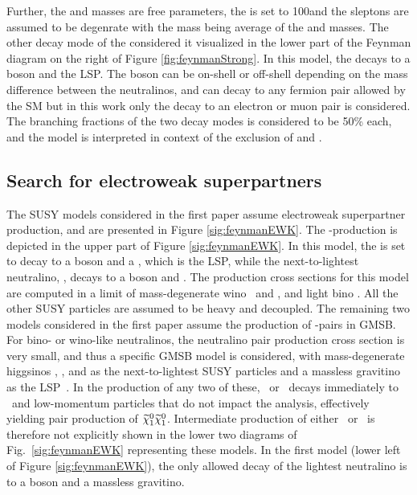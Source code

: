 Further, the \sbottom and \PSGczDt masses are free parameters, the \PSGczDo is set to 100\GeV and the sleptons are assumed to be degenrate with the mass being average of the \PSGczDt and \PSGczDo masses. 
The other decay mode of the \PSGczDt considered it visualized in the lower part of the Feynman diagram on the right of Figure \ref{fig:feynmanStrong}.
In this model, the \PSGczDt decays to a \PZ boson and the \PSGczDo LSP. 
The \PZ boson can be on-shell or off-shell depending on the mass difference between the neutralinos, and can decay to any fermion pair allowed by the SM but in this work only the decay to an electron or muon pair is considered. 
The branching fractions of the two \PSGczDt decay modes is considered to be 50\% each, and the model is interpreted in context of the exclusion of \sbottom and \PSGczDt. 
\subsection*{Search for electroweak superpartners}\label{sec:searchEWK}
\noindent
\justify
The SUSY models considered in the first paper assume electroweak superpartner production, and are presented in Figure \ref{sig:feynmanEWK}. 
The \firstcharg-\secondchi production is depicted in the upper part of Figure \ref{sig:feynmanEWK}. 
In this model, the \firstcharg is set to decay to a \PW boson and a \firstchi, which is the LSP, while the next-to-lightest neutralino, \secondchi, decays to a \PZ boson and \firstchi.
The production cross sections for this model are computed in a limit of mass-degenerate wino \firstcharg\ and \secondchi, and light bino \firstchi.  
All the other SUSY particles are assumed to be heavy and decoupled.
The remaining two models considered in the first paper assume the production of \firstchi-\firstchi pairs in GMSB.
For bino- or wino-like neutralinos, the neutralino pair production cross section is very small, and thus a specific GMSB model is considered, with mass-degenerate higgsinos \firstcharg, \secondchi, and \firstchi as the next-to-lightest SUSY particles and a massless gravitino as the LSP~\cite{Matchev:1999ft,Meade:2009qv,Ruderman}.
In the production of any two of these, \firstcharg\ or \secondchi\ decays immediately to \firstchi\ and low-momentum particles that do not impact the analysis, effectively yielding pair production of $\widetilde{\chi}^{0}_{1}\widetilde{\chi}^{0}_{1}$.
Intermediate production of either \firstcharg\ or \secondchi\ is therefore not explicitly shown in the lower two diagrams of Fig.~\ref{sig:feynmanEWK} representing these models.
In the first model (lower left of Figure \ref{sig:feynmanEWK}), the only allowed decay of the lightest neutralino is to a \PZ boson and a massless gravitino.
